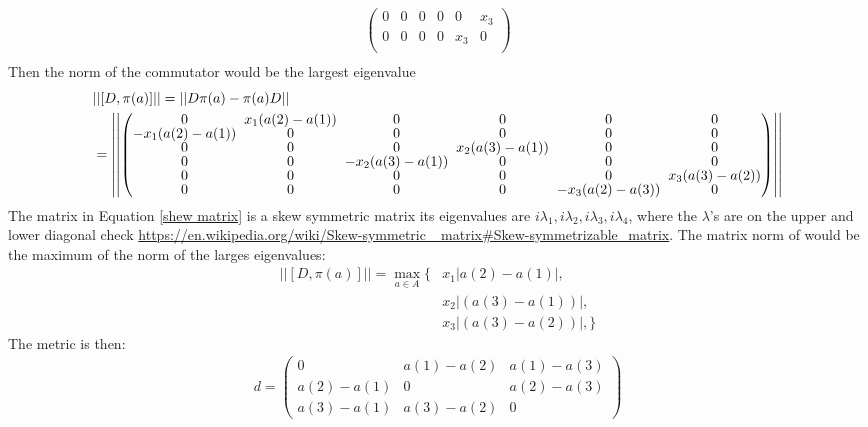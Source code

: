\documentclass[a4paper]{article}
\newcounter{exercise}
\newenvironment{MyExercise}%
{\begin{mdframed}[style=exercisestyle]}{\end{mdframed}}
\theoremstyle{definition}
\theoremstyle{definition}
\theoremstyle{definition}
\theoremstyle{theorem}
\theoremstyle{theorem}
\begin{document}
\begin{MyExercise}
\begin{align}
\begin{pmatrix}
            0   & 0   & 0 & 0 & 0 & x_3 \\
            0   & 0   & 0 & 0 & x_3 & 0 \\
        \end{pmatrix} \\
    \end{align}
    Then the norm of the commutator would be the largest eigenvalue
    \begin{align}
        &||[D, \pi(a)]|| = ||D\pi(a) - \pi(a)D||\nonumber\\
        &=
        \left|\left|
    \setlength{\arraycolsep}{0.1cm}
      \renewcommand{\arraystretch}{0.1}
        \begin{pmatrix}
            0   & x_1(a(2)-a(1)) & 0 & 0 & 0 & 0 \\
            -x_1(a(2)-a(1)) & 0   & 0 & 0 & 0 & 0 \\
            0   & 0   & 0 & x_2(a(3)-a(1)) & 0 & 0 \\
            0   & 0   & -x_2(a(3)-a(1)) & 0 & 0 & 0 \\
            0   & 0   & 0 & 0 & 0 & x_3(a(3)-a(2)) \\
            0   & 0   & 0 & 0 & -x_3(a(2)-a(3)) & 0 \\
        \end{pmatrix}\right|\right| \label{skew matrix}
    \end{align}
The matrix in Equation \ref{shew matrix} is a skew symmetric matrix its eigenvalues
are $i\lambda_1, i\lambda_2, i\lambda_3, i\lambda_4$, where the $\lambda$'s are on the
upper and lower diagonal check \url{https://en.wikipedia.org/wiki/Skew-symmetric_
matrix#Skew-symmetrizable_matrix}. The matrix norm of would be the maximum of the norm of
the larges eigenvalues:
\begin{align}
    ||[D, \pi(a)]|| = \max_{a\in A}\{&x_1|a(2)-a(1)|,\\
    &x_2|(a(3)-a(1))|,\nonumber\\
    &x_3|(a(3)-a(2))|,\}\nonumber
\end{align}
The metric is then:
\begin{align}
    d =
    \begin{pmatrix}
        0 & a(1)-a(2) & a(1)-a(3)\\
        a(2)-a(1) & 0 & a(2)-a(3)\\
        a(3)-a(1) & a(3)-a(2) & 0
    \end{pmatrix}
\end{align}
\end{MyExercise}
\end{document}
